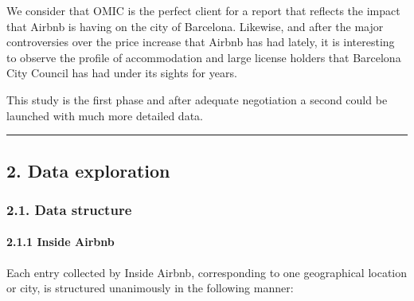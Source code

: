 \documentclass[
]{article}
\begin{document}
We consider that OMIC is the perfect client for a report that reflects
the impact that Airbnb is having on the city of Barcelona. Likewise, and
after the major controversies over the price increase that Airbnb has
had lately, it is interesting to observe the profile of accommodation
and large license holders that Barcelona City Council has had under its
sights for years.

This study is the first phase and after adequate negotiation a second
could be launched with much more detailed data.

\begin{center}\rule{0.5\linewidth}{0.5pt}\end{center}

\hypertarget{data-exploration}{%
\subsection{2. Data exploration}\label{data-exploration}}

\hypertarget{data-structure}{%
\subsubsection{2.1. Data structure}\label{data-structure}}

\hypertarget{inside-airbnb-1}{%
\paragraph{2.1.1 Inside Airbnb}\label{inside-airbnb-1}}

Each entry collected by Inside Airbnb, corresponding to one geographical
location or city, is structured unanimously in the following manner:
\end{document}
